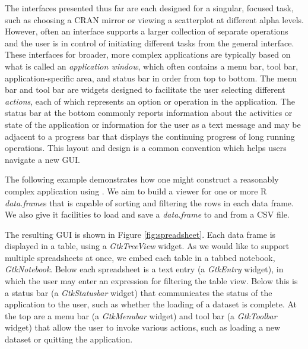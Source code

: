 \documentclass[article]{jss}
\begin{document}
The interfaces presented thus far are each designed for a singular,
focused task, such as choosing a CRAN mirror or viewing a scatterplot
at different alpha levels.  However, often an interface supports a
larger collection of separate operations and the user is in control of
initiating different tasks from the general interface. These
interfaces for broader, more complex
applications are typically based on what is called an
\emph{application window}, which often contains a menu bar, tool bar,
application-specific area, and status bar in order from top to
bottom. The menu bar and tool bar are widgets designed to facilitate
the user selecting different \emph{actions}, each of which represents
an option or operation in the application.  The status bar at the
bottom commonly reports information about the activities or state of
the application or information for the user as a text message and may
be adjacent to a progress bar that displays the continuing progress of
long running operations.  This layout and design is a common
convention which helps users navigate a new GUI.


The following example demonstrates how one might construct a reasonably complex
application using . We aim to build a viewer for one or
more R \emph{data.frame}s that is capable of sorting and filtering the
rows in each data frame. We also give it facilities to load and save a
\emph{data.frame} to and from a CSV file. 

The resulting GUI is shown in Figure \ref{fig:spreadsheet}. Each data
frame is displayed in a table, using a \emph{GtkTreeView} widget. As
we would like to support multiple spreadsheets at once, we embed each
table in a tabbed notebook, \emph{GtkNotebook}. Below each spreadsheet
is a text entry (a \emph{GtkEntry} widget), in which the user may
enter an expression for filtering the table view. Below this is a
status bar (a \emph{GtkStatusbar} widget) that communicates the status
of the application to the user, such as whether the loading of a
dataset is complete. At the top are a menu bar (a \emph{GtkMenubar}
widget) and tool bar (a \emph{GtkToolbar} widget) that allow the user
to invoke various actions, such as loading a new dataset or quitting
the application.

\end{document}
